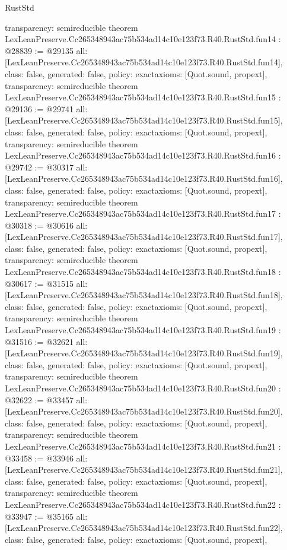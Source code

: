 \begin{lexlean}{RustStd}
\begin{coremodule}
{  transparency: semireducible
}
theorem LexLeanPreserve.Cc265348943ac75b534ad14c10e123f73.R40.RustStd.fun14 : @28839 := @29135 {
  all: [LexLeanPreserve.Cc265348943ac75b534ad14c10e123f73.R40.RustStd.fun14],
  class: false,
  generated: false,
  policy: exact{axioms: [Quot.sound, propext]},
  transparency: semireducible
}
theorem LexLeanPreserve.Cc265348943ac75b534ad14c10e123f73.R40.RustStd.fun15 : @29136 := @29741 {
  all: [LexLeanPreserve.Cc265348943ac75b534ad14c10e123f73.R40.RustStd.fun15],
  class: false,
  generated: false,
  policy: exact{axioms: [Quot.sound, propext]},
  transparency: semireducible
}
theorem LexLeanPreserve.Cc265348943ac75b534ad14c10e123f73.R40.RustStd.fun16 : @29742 := @30317 {
  all: [LexLeanPreserve.Cc265348943ac75b534ad14c10e123f73.R40.RustStd.fun16],
  class: false,
  generated: false,
  policy: exact{axioms: [Quot.sound, propext]},
  transparency: semireducible
}
theorem LexLeanPreserve.Cc265348943ac75b534ad14c10e123f73.R40.RustStd.fun17 : @30318 := @30616 {
  all: [LexLeanPreserve.Cc265348943ac75b534ad14c10e123f73.R40.RustStd.fun17],
  class: false,
  generated: false,
  policy: exact{axioms: [Quot.sound, propext]},
  transparency: semireducible
}
theorem LexLeanPreserve.Cc265348943ac75b534ad14c10e123f73.R40.RustStd.fun18 : @30617 := @31515 {
  all: [LexLeanPreserve.Cc265348943ac75b534ad14c10e123f73.R40.RustStd.fun18],
  class: false,
  generated: false,
  policy: exact{axioms: [Quot.sound, propext]},
  transparency: semireducible
}
theorem LexLeanPreserve.Cc265348943ac75b534ad14c10e123f73.R40.RustStd.fun19 : @31516 := @32621 {
  all: [LexLeanPreserve.Cc265348943ac75b534ad14c10e123f73.R40.RustStd.fun19],
  class: false,
  generated: false,
  policy: exact{axioms: [Quot.sound, propext]},
  transparency: semireducible
}
theorem LexLeanPreserve.Cc265348943ac75b534ad14c10e123f73.R40.RustStd.fun20 : @32622 := @33457 {
  all: [LexLeanPreserve.Cc265348943ac75b534ad14c10e123f73.R40.RustStd.fun20],
  class: false,
  generated: false,
  policy: exact{axioms: [Quot.sound, propext]},
  transparency: semireducible
}
theorem LexLeanPreserve.Cc265348943ac75b534ad14c10e123f73.R40.RustStd.fun21 : @33458 := @33946 {
  all: [LexLeanPreserve.Cc265348943ac75b534ad14c10e123f73.R40.RustStd.fun21],
  class: false,
  generated: false,
  policy: exact{axioms: [Quot.sound, propext]},
  transparency: semireducible
}
theorem LexLeanPreserve.Cc265348943ac75b534ad14c10e123f73.R40.RustStd.fun22 : @33947 := @35165 {
  all: [LexLeanPreserve.Cc265348943ac75b534ad14c10e123f73.R40.RustStd.fun22],
  class: false,
  generated: false,
  policy: exact{axioms: [Quot.sound, propext]},
}
\end{coremodule}
\end{lexlean}
